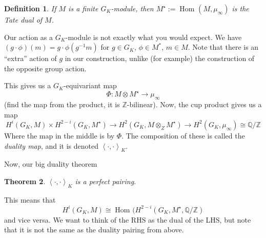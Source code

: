 \documentclass[a4paper]{article}
\newtheorem{thm}{Theorem}[section]
\newtheorem{defn}[thm]{Definition}
\newcommand{\isom}{\cong}
\newcommand{\Hom}{\operatorname{Hom}}
\begin{document}
\begin{defn}
	If \(M\) is a finite \(G_{K}\)-module, then \(M^{\star} :=
	\Hom_{} (M,\mu_{\infty})\) is the \textit{Tate dual} of \(M\).
\end{defn}

Our action as a \(G_{K}\)-module is not exactly what you would expect.
We have  \((g \cdot \phi)(m) = g \cdot \phi(g^{-1} m)\) for \(g \in G_{K}\),
\(\phi \in M^{*}\), \(m \in M\).
Note that there is an ``extra'' action of \(g\) in our construction,
unlike (for example) the construction of the opposite group action.

This gives us a \(G_{K}\)-equivariant map  
\[
\Phi : M \otimes M^{\star} \to \mu_{\infty}
\] 
(find the map from the product, it is \(\mathbb{Z}\)-bilinear).
Now, the cup product gives us a map
\[
	H^{i}(G_{K},M) \times H^{2-i}(G_{K},M^{\star})
	\to H^{2}(G_{K}, M \otimes_{Z} M^{\star})
	\to H^{2}(G_{K}, \mu_{\infty})
	\isom \mathbb{Q} / \mathbb{Z}
\] 
Where the map in the middle is by \(\Phi\).
The composition of these is called the \textit{duality map}, and it is 
denoted \(\left<\cdot,\cdot \right>_{K}\).

Now, our big duality theorem

\begin{thm}
	\(\left<\cdot,\cdot\right>_{K}\) is a perfect pairing.
\end{thm}

This means that 
\[
	H^{i}(G_{K},M) \isom \Hom_{} (H^{2-i}(G_{K},M^{\star},\mathbb{Q} / \mathbb{Z})
\] 
and vice versa.
We want to think of the RHS as the dual of the LHS, but note that it 
is not the same as the duality pairing from above. 
\end{document}
